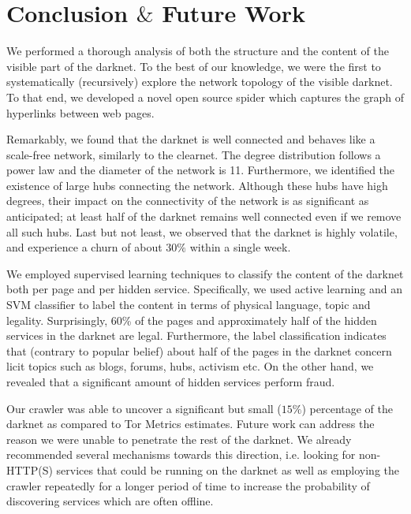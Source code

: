 \section{Conclusion $\&$ Future Work}

We performed a thorough analysis of both the structure and the content of the visible part of the darknet. To the best of our knowledge, we were the first to systematically (recursively) explore the network topology of the visible darknet. To that end, we developed a novel open source spider which captures the graph of hyperlinks between web pages. 

Remarkably, we found that the darknet is well connected and behaves like a scale-free network, similarly to the clearnet. The degree distribution follows a power law and the diameter of the network is 11. Furthermore, we identified the existence of large hubs connecting the network. Although these hubs have  high degrees, their impact on the connectivity of the network is as significant as anticipated; at least half of the darknet remains well connected even if we remove all such hubs. Last but not least, we observed that the darknet is highly volatile, and experience a churn of about $30\%$ within a single week.

We employed supervised learning techniques to classify the content of the darknet both per page and per hidden service. Specifically, we used active learning and an SVM classifier to label the content in terms of physical language, topic and legality. 
Surprisingly, 60\% of the pages and approximately half of the hidden services in the darknet are legal. Furthermore, the label classification indicates that (contrary to popular belief) about half of the pages in the darknet concern licit topics such as blogs, forums, hubs, activism etc. On the other hand, we revealed that a significant amount of hidden services perform fraud. 

Our crawler was able to uncover a significant but small ($15\%$) percentage of the darknet as compared to Tor Metrics estimates. Future work can address the reason we were unable to penetrate the rest of the darknet. We already recommended several mechanisms towards this direction, i.e. looking for non-HTTP(S) services that could be running on the darknet as well as employing the crawler repeatedly for a longer period of time to increase the probability of discovering services which are often offline.


